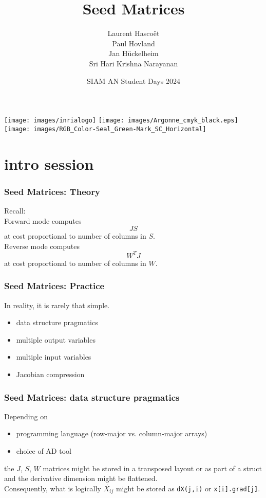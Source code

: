\documentclass[compact,12pt]{beamer}
\title[Seeds]{Seed Matrices}
\author{Laurent Hasco\"{e}t  \\
        Paul Hovland  \\
        Jan  H\"{u}ckelheim \\
        Sri Hari Krishna Narayanan
}
\date[AN 2024]{SIAM AN Student Days 2024}
\begin{document}
\begin{frame}
\maketitle
\begin{center}
\texttt{[image: images/inrialogo]}
\texttt{[image: images/Argonne\_cmyk\_black.eps]}
\texttt{[image: images/RGB\_Color-Seal\_Green-Mark\_SC\_Horizontal]}
\end{center}
\end{frame}

\section{intro session}

\begin{frame}
\large\frametitle{Seed Matrices: Theory}
Recall:\\
Forward mode computes
$$JS$$
at cost proportional to number of columns in $S$.\\[0.5em]
Reverse mode computes
$$W^TJ$$
at cost proportional to number of columns in $W$.
\end{frame}

\begin{frame}
\large\frametitle{Seed Matrices: Practice}
In reality, it is rarely that simple.
\begin{itemize}
    \item data structure pragmatics
    \item multiple output variables
    \item multiple input variables
    \item Jacobian compression
\end{itemize}
\end{frame}

\begin{frame}
\large\frametitle{Seed Matrices: data structure pragmatics}
Depending on
\begin{itemize}
    \item programming language (row-major vs. column-major arrays)
    \item choice of AD tool
\end{itemize}
the $J$, $S$, $W$ matrices might be stored in a transposed layout or as part of a struct and the derivative dimension might be flattened.\\[0.5em]

Consequently, what is logically $\Dot{X_{ij}}$ might be stored as \texttt{dX(j,i)} or \texttt{x[i].grad[j]}.
\end{frame}
\end{document}

